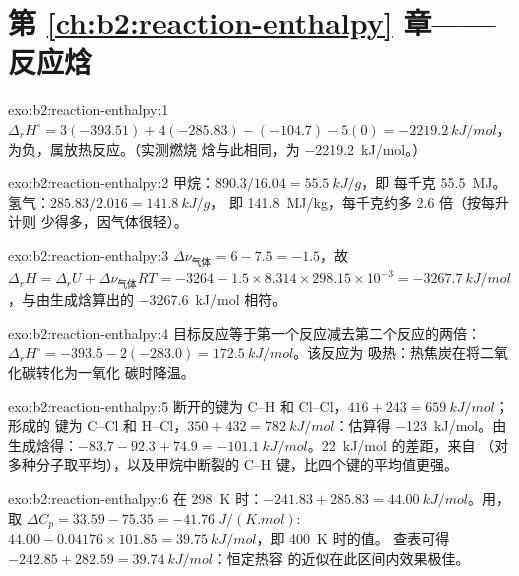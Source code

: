 \section*{第 \ref{ch:b2:reaction-enthalpy} 章——反应焓}

\begin{solution}{exo:b2:reaction-enthalpy:1}
$\Delta_r H^\circ = 3(-393.51) + 4(-285.83) - (-104.7) - 5(0) =
\qty{-2219.2}{kJ/mol}$，为负，属放热反应。（实测燃烧
焓与此相同，为 \qty{-2219.2}{kJ/mol}。）
\end{solution}

\begin{solution}{exo:b2:reaction-enthalpy:2}
甲烷：$890.3/16.04 = \qty{55.5}{kJ/g}$，即
每千克 \qty{55.5}{MJ}。氢气：$285.83/2.016 = \qty{141.8}{kJ/g}$，
即 \qty{141.8}{MJ/kg}，每千克约多 2.6 倍（按每升计则
少得多，因气体很轻）。
\end{solution}

\begin{solution}{exo:b2:reaction-enthalpy:3}
$\Delta\nu_{\text{气体}} = 6 - 7.5 = -1.5$，故 $\Delta_r H = \Delta_r U +
\Delta\nu_{\text{气体}}RT = -3264 - 1.5 \times 8.314 \times 298.15 \times
10^{-3} = \qty{-3267.7}{kJ/mol}$，与由生成焓算出的
\qty{-3267.6}{kJ/mol} 相符。
\end{solution}

\begin{solution}{exo:b2:reaction-enthalpy:4}
目标反应等于第一个反应减去第二个反应的两倍：
$\Delta_r H^\circ = -393.5 - 2(-283.0) = \qty{+172.5}{kJ/mol}$。该反应为
吸热：热焦炭在将二氧化碳转化为一氧化
碳时降温。
\end{solution}

\begin{solution}{exo:b2:reaction-enthalpy:5}
断开的键为 C--H 和 Cl--Cl，$416 + 243 = \qty{659}{kJ/mol}$；形成的
键为 C--Cl 和 H--Cl，$350 + 432 = \qty{782}{kJ/mol}$：估算得
\qty{-123}{kJ/mol}。由生成焓得：$-83.7 - 92.3 + 74.9 =
\qty{-101.1}{kJ/mol}$。\qty{22}{kJ/mol} 的差距，来自
（对多种分子取平均），以及甲烷中断裂的
C--H 键，比四个键的平均值更强。
\end{solution}

\begin{solution}{exo:b2:reaction-enthalpy:6}
在 \qty{298}{K} 时：$-241.83 + 285.83 = \qty{44.00}{kJ/mol}$。用，取
$\Delta C_p = 33.59 - 75.35 = \qty{-41.76}{J/(K.mol)}$:
$44.00 - 0.04176 \times 101.85 = \qty{39.75}{kJ/mol}$，即 \qty{400}{K} 时的值。
查表可得 $-242.85 + 282.59 = \qty{39.74}{kJ/mol}$：恒定热容
的近似在此区间内效果极佳。
\end{solution}

